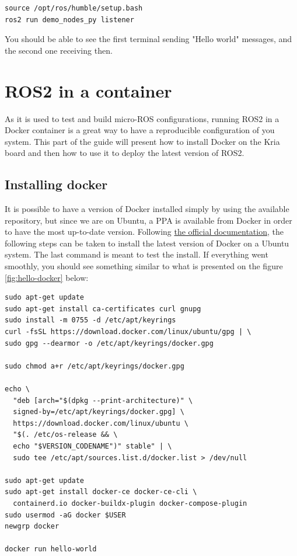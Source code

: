 \documentclass[10pt]{article}
\begin{document}
\begin{tcolorbox}
\begin{verbatim}
source /opt/ros/humble/setup.bash
ros2 run demo_nodes_py listener
\end{verbatim}
\end{tcolorbox}


You should be able to see the first terminal sending "Hello world" messages, and the second one receiving then.


\section{ROS2 in a container}
\label{sec:ros2-container}
As it is used to test and build micro-ROS configurations, running ROS2 in a Docker container is a great way to have a reproducible configuration
of you system. This part of the guide will present how to install Docker on the Kria board and then how to use it to deploy the latest
version of ROS2.

\subsection{Installing docker}
\label{sec:installing-docker}
It is possible to have a version of Docker installed simply by using the available repository, but since we are on Ubuntu, a PPA is available
from Docker in order to have the most up-to-date version.
Following \href{https://docs.docker.com/engine/install/ubuntu/#install-using-the-repository}{the official documentation}, the following steps can be taken to
install the latest version of Docker on a Ubuntu system.
The last command is meant to test the install. If everything went smoothly, you should see something similar to what is presented on the figure \ref{fig:hello-docker} below:
\begin{tcolorbox}
\begin{verbatim}
sudo apt-get update
sudo apt-get install ca-certificates curl gnupg
sudo install -m 0755 -d /etc/apt/keyrings
curl -fsSL https://download.docker.com/linux/ubuntu/gpg | \
sudo gpg --dearmor -o /etc/apt/keyrings/docker.gpg

sudo chmod a+r /etc/apt/keyrings/docker.gpg

echo \
  "deb [arch="$(dpkg --print-architecture)" \
  signed-by=/etc/apt/keyrings/docker.gpg] \
  https://download.docker.com/linux/ubuntu \
  "$(. /etc/os-release && \
  echo "$VERSION_CODENAME")" stable" | \
  sudo tee /etc/apt/sources.list.d/docker.list > /dev/null

sudo apt-get update
sudo apt-get install docker-ce docker-ce-cli \
  containerd.io docker-buildx-plugin docker-compose-plugin
sudo usermod -aG docker $USER
newgrp docker

docker run hello-world
\end{verbatim}
\end{tcolorbox}
\end{document}
